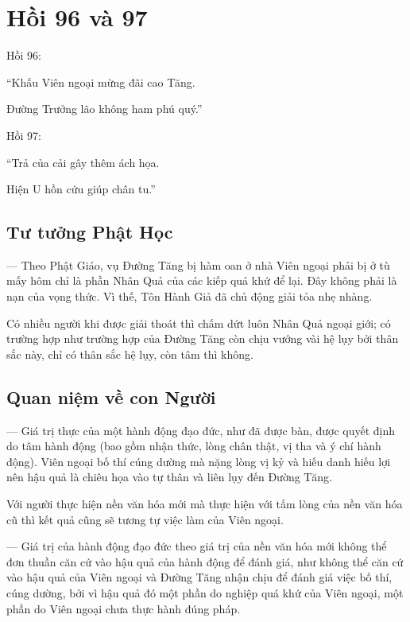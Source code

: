 \chapter{Hồi 96 và 97} %
\label{cha:hoi_96_97}

Hồi 96:

\begin{itshape}
``Khấu Viên ngoại mừng đãi cao Tăng.

Đường Trưởng lão không ham phú quý.''
\end{itshape}

Hồi 97:

\begin{itshape}
``Trả của cải gây thêm ách họa.

Hiện U hồn cứu giúp chân tu.''
\end{itshape}

\section{Tư tưởng Phật Học} %
\label{sec:96_97_phat_hoc}

--- Theo Phật Giáo, vụ Đường Tăng bị hàm oan ở nhà Viên ngoại phải bị ở tù mấy hôm chỉ là phần Nhân Quả của các kiếp quá khứ để lại. Đây không phải là nạn của vọng thức. Vì thế, Tôn Hành Giả đã chủ động giải tỏa nhẹ nhàng.

Có nhiều người khi được giải thoát thì chấm dứt luôn Nhân Quả ngoại giới; có trường hợp như trường hợp của Đường Tăng còn chịu vướng vài hệ lụy bởi thân sắc này, chỉ có thân sắc hệ lụy, còn tâm thì không.

\section{Quan niệm về con Người} %
\label{sec:96_97_con_nguoi}

--- Giá trị thực của một hành động đạo đức, như đã được bàn, được quyết định do tâm hành động (bao gồm nhận thức, lòng chân thật, vị tha và ý chí hành động). Viên ngoại bố thí cúng dường mà nặng lòng vị kỷ và hiếu danh hiếu lợi nên hậu quả là chiêu họa vào tự thân và liên lụy đến Đường Tăng.

Với người thực hiện nền văn hóa mới mà thực hiện với tấm lòng của nền văn hóa cũ thì kết quả cũng sẽ tương tự việc làm của Viên ngoại.

--- Giá trị của hành động đạo đức theo giá trị của nền văn hóa mới không thể đơn thuần căn cứ vào hậu quả của hành động để đánh giá, như không thể căn cứ vào hậu quả của Viên ngoại và Đường Tăng nhận chịu để đánh giá việc bố thí, cúng dường, bởi vì hậu quả đó một phần do nghiệp quá khứ của Viên ngoại, một phần do Viên ngoại chưa thực hành đúng pháp.

